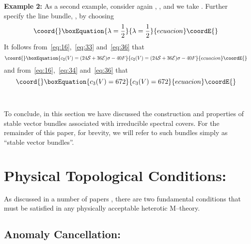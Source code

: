 \documentclass[a4paper,12pt]{article}
\numberwithin{equation}{section}
\def\cE{{\mathcal E}}
\def\cN{{\mathcal N}}
\def\cS{{\mathcal S}}
\theoremstyle{plain}
\begin{document}
\noindent
{\bf Example 2:} \quad
As a second example, consider
again \coordHE{}, \coordHE{}, \coordHE{} and we take \myHighlight{$\eta= 24S+36\cE$}\coordHE{}.
Further specify the line bundle, \myHighlight{$\cN$}\coordHE{}, by choosing
\begin{equation}\coord{}\boxEquation{
\lambda=\frac{1}{2}
\label{eq:40}
}{
\lambda=\frac{1}{2}
}{ecuacion}\coordE{}\end{equation}
It follows from~\eqref{eq:16},~\eqref{eq:33} and~\eqref{eq:36} that
\begin{equation}\coord{}\boxEquation{
c_{2}(V)= (24\cS+36\cE)\sigma-40F
\label{eq:41}
}{
c_{2}(V)= (24\cS+36\cE)\sigma-40F
}{ecuacion}\coordE{}\end{equation}
and from~\eqref{eq:16},~\eqref{eq:34} and~\eqref{eq:36} that
\begin{equation}\coord{}\boxEquation{
c_{3}(V)= 672
\label{eq:42}
}{
c_{3}(V)= 672
}{ecuacion}\coordE{}\end{equation}

\smallskip

\

To conclude, in this section we have discussed the construction and properties
of stable \coordHE{} vector bundles associated with irreducible spectral covers.
For the remainder of this paper, for brevity, we will refer to such bundles
simply as ``stable \coordHE{} vector bundles''.


\section{Physical Topological Conditions:}


As discussed in a number of papers \cite{nse, curio, lpt, GSW}, 
there are two fundamental conditions
that must be satisfied in any physically acceptable heterotic M--theory. 

\subsection*{Anomaly Cancellation:}
\end{document}
